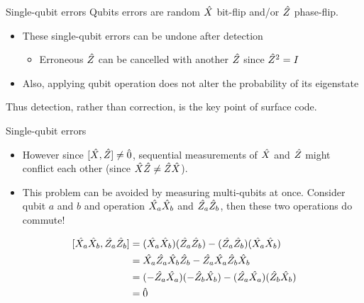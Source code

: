 \documentclass{beamer}
\begin{document}
    \begin{frame}{Single-qubit errors}
        Qubits errors are random $ \shat{X} $ bit-flip and/or $ \shat{Z} $ phase-flip.
        \begin{itemize}
            \item These single-qubit errors can be undone after detection
            \begin{itemize}
                \item Erroneous $ \shat{Z} $ can be cancelled with another $ \shat{Z} $ since $ \shat{Z}^2 = I $
            \end{itemize}
            \item Also, applying qubit operation does not alter the probability of its eigenstate
        \end{itemize}
        Thus detection, rather than correction, is the key point of surface code.
    \end{frame}
    
    \begin{frame}{Single-qubit errors}
        \begin{itemize}
            \item However since $ [\shat{X}, \shat{Z}] \neq \hat{0} $, sequential measurements of $ \shat{X} $ and $ \shat{Z} $ might conflict each other (since $ \shat{X}\shat{Z} \neq \shat{Z}\shat{X} $).
            \item This problem can be avoided by measuring multi-qubits at once. Consider qubit $ a $ and $ b $ and operation $ \sshat{X_a}\sshat{X_b} $ and $ \sshat{Z_a}\sshat{Z_b} $, then these two operations do commute!
        \end{itemize}
        \begin{equation}
        \begin{split}
        [\sshat{X_a}\sshat{X_b}, \sshat{Z_a}\sshat{Z_b}] &= (\sshat{X_a}\sshat{X_b})(\sshat{Z_a}\sshat{Z_b}) - (\sshat{Z_a}\sshat{Z_b})(\sshat{X_a}\sshat{X_b}) \\
        &= \sshat{X_a}\sshat{Z_a}\sshat{X_b}\sshat{Z_b} - \sshat{Z_a}\sshat{X_a}\sshat{Z_b}\sshat{X_b} \\
        &= (-\sshat{Z_a}\sshat{X_a})(-\sshat{Z_b}\sshat{X_b}) - (\sshat{Z_a}\sshat{X_a})(\sshat{Z_b}\sshat{X_b}) \\
        &= \hat{0}
        \end{split}
        \end{equation}
    \end{frame}
    
\end{document}
